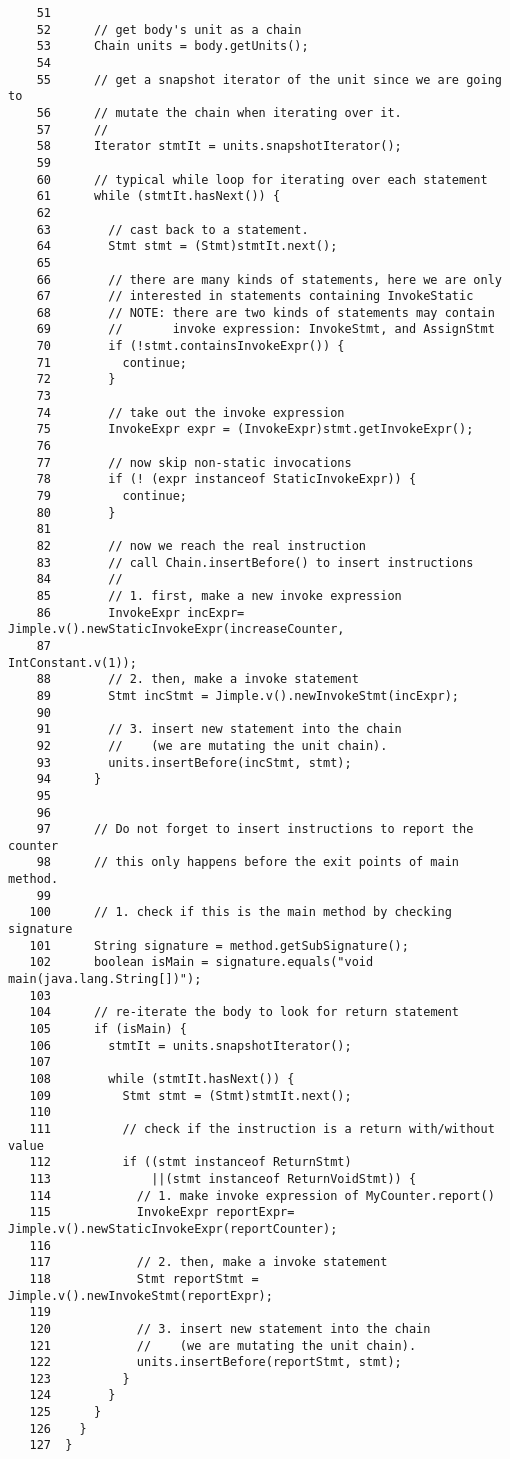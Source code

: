 \documentclass[12pt]{article}
\begin{document}
\begin{verbatim}
    51
    52      // get body's unit as a chain
    53      Chain units = body.getUnits();
    54
    55      // get a snapshot iterator of the unit since we are going to
    56      // mutate the chain when iterating over it.
    57      //
    58      Iterator stmtIt = units.snapshotIterator();
    59
    60      // typical while loop for iterating over each statement
    61      while (stmtIt.hasNext()) {
    62
    63        // cast back to a statement.
    64        Stmt stmt = (Stmt)stmtIt.next();
    65
    66        // there are many kinds of statements, here we are only
    67        // interested in statements containing InvokeStatic
    68        // NOTE: there are two kinds of statements may contain
    69        //       invoke expression: InvokeStmt, and AssignStmt
    70        if (!stmt.containsInvokeExpr()) {
    71          continue;
    72        }
    73
    74        // take out the invoke expression
    75        InvokeExpr expr = (InvokeExpr)stmt.getInvokeExpr();
    76
    77        // now skip non-static invocations
    78        if (! (expr instanceof StaticInvokeExpr)) {
    79          continue;
    80        }
    81
    82        // now we reach the real instruction
    83        // call Chain.insertBefore() to insert instructions
    84        //
    85        // 1. first, make a new invoke expression
    86        InvokeExpr incExpr= Jimple.v().newStaticInvokeExpr(increaseCounter,
    87                                                    IntConstant.v(1));
    88        // 2. then, make a invoke statement
    89        Stmt incStmt = Jimple.v().newInvokeStmt(incExpr);
    90
    91        // 3. insert new statement into the chain
    92        //    (we are mutating the unit chain).
    93        units.insertBefore(incStmt, stmt);
    94      }
    95
    96
    97      // Do not forget to insert instructions to report the counter
    98      // this only happens before the exit points of main method.
    99
   100      // 1. check if this is the main method by checking signature
   101      String signature = method.getSubSignature();
   102      boolean isMain = signature.equals("void main(java.lang.String[])");
   103
   104      // re-iterate the body to look for return statement
   105      if (isMain) {
   106        stmtIt = units.snapshotIterator();
   107
   108        while (stmtIt.hasNext()) {
   109          Stmt stmt = (Stmt)stmtIt.next();
   110
   111          // check if the instruction is a return with/without value
   112          if ((stmt instanceof ReturnStmt)
   113              ||(stmt instanceof ReturnVoidStmt)) {
   114            // 1. make invoke expression of MyCounter.report()
   115            InvokeExpr reportExpr= Jimple.v().newStaticInvokeExpr(reportCounter);
   116
   117            // 2. then, make a invoke statement
   118            Stmt reportStmt = Jimple.v().newInvokeStmt(reportExpr);
   119
   120            // 3. insert new statement into the chain
   121            //    (we are mutating the unit chain).
   122            units.insertBefore(reportStmt, stmt);
   123          }
   124        }
   125      }
   126    }
   127  }
\end{verbatim}
\end{document}
